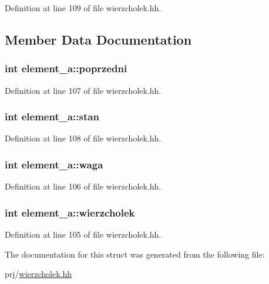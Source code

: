 \-Definition at line 109 of file wierzcholek.\-hh.



\subsection{\-Member \-Data \-Documentation}
\hypertarget{structelement__a_a4e6b23a45c539eea4ab51d74aeef11e2}{
\subsubsection[{poprzedni}]{\setlength{\rightskip}{0pt plus 5cm}int {\bf element\-\_\-a\-::poprzedni}}}\label{structelement__a_a4e6b23a45c539eea4ab51d74aeef11e2}


\-Definition at line 107 of file wierzcholek.\-hh.

\hypertarget{structelement__a_a1be911aa9cf4faf7105ae58ec04d4bd7}{
\subsubsection[{stan}]{\setlength{\rightskip}{0pt plus 5cm}int {\bf element\-\_\-a\-::stan}}}\label{structelement__a_a1be911aa9cf4faf7105ae58ec04d4bd7}


\-Definition at line 108 of file wierzcholek.\-hh.

\hypertarget{structelement__a_a0c44e77b4e694ff0f7e2a5ec75a78f48}{
\subsubsection[{waga}]{\setlength{\rightskip}{0pt plus 5cm}int {\bf element\-\_\-a\-::waga}}}\label{structelement__a_a0c44e77b4e694ff0f7e2a5ec75a78f48}


\-Definition at line 106 of file wierzcholek.\-hh.

\hypertarget{structelement__a_acebbe0c4962a9b7f11702c041474bdfc}{
\subsubsection[{wierzcholek}]{\setlength{\rightskip}{0pt plus 5cm}int {\bf element\-\_\-a\-::wierzcholek}}}\label{structelement__a_acebbe0c4962a9b7f11702c041474bdfc}


\-Definition at line 105 of file wierzcholek.\-hh.



\-The documentation for this struct was generated from the following file\-:\begin{DoxyCompactItemize}
\item 
prj/\hyperlink{wierzcholek_8hh}{wierzcholek.\-hh}\end{DoxyCompactItemize}
